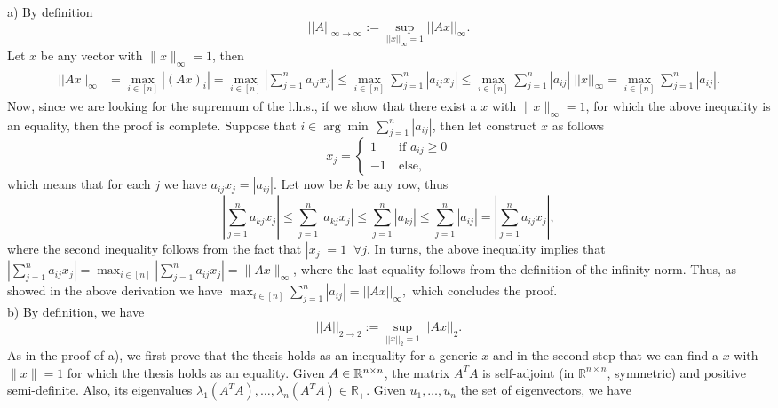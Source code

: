\documentclass{ExerciseSheet}
\newif\ifsolutions
\begin{document}
\ifsolutions
\vskip 0.3cm
\begin{solution}
a) By definition
\begin{equation*}
	||A||_{\infty\to \infty}:= \sup_{||x||_\infty=1} ||Ax||_\infty.
\end{equation*}
Let $x$ be any vector with $\|x\|_{\infty}=1$, then
\begin{align*}
||Ax||_\infty&= \max_{i\in[n]} |(Ax)_i| = %
\max_{i\in[n]} \left |\sum_{j=1}^{n} a_{ij} x_j \right| \leq \max_{i\in[n]} \sum_{j=1}^{n} | a_{ij} x_j | \leq \max_{i\in[n]} \sum_{j=1}^{n} | a_{ij}| \; ||x||_{\infty}= \max_{i\in[n]} \sum_{j=1}^{n} | a_{ij}|.
\end{align*}
Now, since we are looking for the supremum of the l.h.s., if we show that there exist a $x$ with $\|x\|_{\infty}=1$, for which the above inequality is an equality, then the proof is complete. Suppose that $i \in \arg\!\min\, \sum_{j=1}^{n} | a_{ij}|$, then let construct $x$ as follows
\begin{equation*}
	x_j =\begin{cases} 1 \quad &\text{if } a_{ij}\geq0\\ -1 &\text{else,}\end{cases}
\end{equation*}
which means that for each $j$ we have $a_{ij}x_j= |a_{ij}|$. Let now be $k$ be any row, thus 
\begin{equation*}
\left |\sum_{j=1}^{n} a_{kj} x_j \right| \leq \sum_{j=1}^{n} | a_{kj} x_j | \leq \sum_{j=1}^{n} | a_{kj} | \leq \sum_{j=1}^{n} | a_{ij} | =  \left | \sum_{j=1}^{n}  a_{ij} x_j \right |,
\end{equation*}
where the second inequality follows from the fact that $|x_j| = 1 \; \; \forall j.$ In turns, the above inequality implies that $\left | \sum_{j=1}^{n}  a_{ij} x_j \right | = \max_{i\in[n]} \left | \sum_{j=1}^{n}  a_{ij} x_j \right | = \| A x\|_{\infty}$, where the last equality follows from the definition of the infinity norm. Thus, as showed in the above derivation we have  $\max_{i \in [n]}\sum_{j=1}^{n} | a_{ij} | = ||Ax||_{\infty},$ which concludes the proof.\\[1\baselineskip]
b) By definition, we have
\begin{equation*}
	||A||_{2\to 2}:= \sup_{||x||_2=1} ||Ax||_2.
\end{equation*}
As in the proof of a), we first prove that the thesis holds as an inequality for a generic $x$ and in the second step that we can find a $x$ with $\|x\|=1$ for which the thesis holds as an equality. Given $A \in \mathbb{R}^{n\times n}$, the matrix $A^TA$ is self-adjoint (in $\mathbb{R}^{n\times n}$, symmetric) and positive semi-definite. Also, its eigenvalues $\lambda_1(A^TA), \dots, \lambda_n(A^TA) \in \mathbb{R}_+$. Given $u_1, \dots, u_n$ the set of eigenvectors, we have 

\end{solution}
\end{document}
